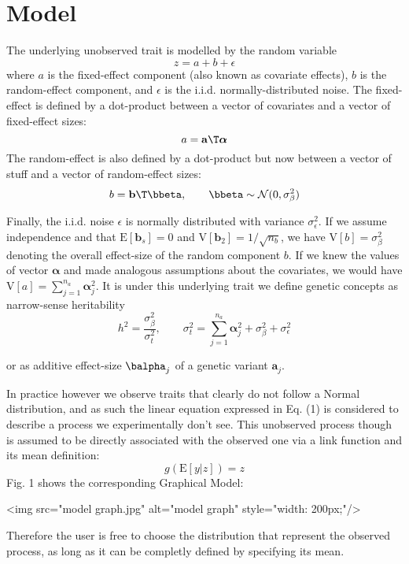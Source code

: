 \section{Model}

The underlying unobserved trait is modelled by the random variable
$$
z = a + b + \epsilon \tag{1}
$$
where $a$ is the fixed-effect component (also known as covariate effects), $b$ is the random-effect component, and $\epsilon$ is the i.i.d. normally-distributed noise. The fixed-effect is defined by a dot-product between a vector of covariates and a vector of fixed-effect sizes:
$$
a = \mathbf a\T \boldsymbol\alpha
$$
The random-effect is also defined by a dot-product but now between a vector of stuff and a vector of random-effect sizes:
$$
b = \mathbf b\T \bbeta, \qquad \bbeta \sim \mathcal N(0, \sigma^2_{\beta})
$$

Finally, the i.i.d. noise $\epsilon$ is normally distributed with variance $\sigma^2_{\epsilon}$. If we assume independence and that $\mathrm E[\mathbf b_s] = 0$ and $\mathrm V[\mathbf b_2]=1/\sqrt{n_b}$, we have $\mathrm V[b] = \sigma^2_{\beta}$ denoting the overall effect-size of the random component $b$. If we knew the values of vector $\boldsymbol\alpha$  and made analogous assumptions about the covariates, we would have $\mathrm V[a]  = \sum_{j=1}^{n_a} \boldsymbol \alpha_j^2$. It is under this underlying trait we define genetic concepts as narrow-sense heritability
$$
h^2=\frac{\sigma^2_{\beta}}{\sigma_t^2}, \qquad \sigma_t^2 = \sum_{j=1}^{n_a} \boldsymbol \alpha_j^2 + \sigma^2_{\beta} + \sigma^2_{\epsilon}
$$

or as additive effect-size $\balpha_j$ of a genetic variant $\mathbf a_j$.

In practice however we observe traits that clearly do not follow a Normal distribution, and as such the linear equation expressed in Eq. (1) is considered to describe a process we experimentally don't see. This unobserved process though is assumed to be directly associated with the observed one via a link function and its mean definition:
$$
g(\mathrm E[y|z]) = z
$$
Fig. 1 shows the corresponding Graphical Model:

<img src="model graph.jpg" alt="model graph" style="width: 200px;"/>

Therefore the user is free to choose the distribution that represent the observed process, as long as it can be completly defined by specifying its mean.
